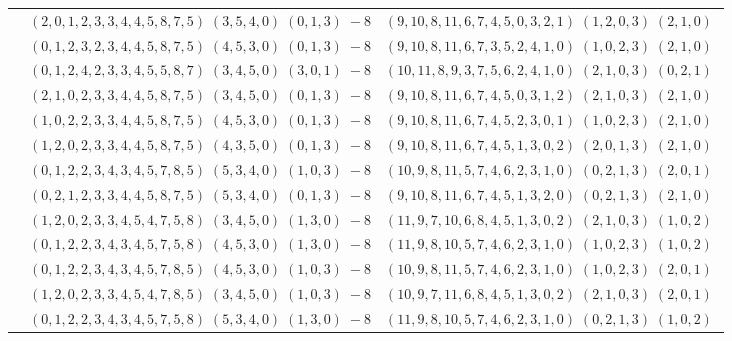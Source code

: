 \documentclass[11pt]{article}
\begin{document}
\begin{longtable}[l]{|c|c|c|}
 \cline{2-3} 
 & $(2 ,0 ,1 ,2 ,3 ,3 ,4 ,4 ,5 ,8 ,7 ,5) \;(3 ,5 ,4 ,0) \;(0 ,1 ,3) \;-8$ & $(9 ,10 ,8 ,11 ,6 ,7 ,4 ,5 ,0 ,3 ,2 ,1) \;(1 ,2 ,0 ,3) \;(2 ,1 ,0) \;$\\ 
 \cline{2-3} 
 & $(0 ,1 ,2 ,3 ,2 ,3 ,4 ,4 ,5 ,8 ,7 ,5) \;(4 ,5 ,3 ,0) \;(0 ,1 ,3) \;-8$ & $(9 ,10 ,8 ,11 ,6 ,7 ,3 ,5 ,2 ,4 ,1 ,0) \;(1 ,0 ,2 ,3) \;(2 ,1 ,0) \;$\\ 
 \cline{2-3} 
 & $(0 ,1 ,2 ,4 ,2 ,3 ,3 ,4 ,5 ,5 ,8 ,7) \;(3 ,4 ,5 ,0) \;(3 ,0 ,1) \;-8$ & $(10 ,11 ,8 ,9 ,3 ,7 ,5 ,6 ,2 ,4 ,1 ,0) \;(2 ,1 ,0 ,3) \;(0 ,2 ,1) \;$\\ 
 \cline{2-3} 
 & $(2 ,1 ,0 ,2 ,3 ,3 ,4 ,4 ,5 ,8 ,7 ,5) \;(3 ,4 ,5 ,0) \;(0 ,1 ,3) \;-8$ & $(9 ,10 ,8 ,11 ,6 ,7 ,4 ,5 ,0 ,3 ,1 ,2) \;(2 ,1 ,0 ,3) \;(2 ,1 ,0) \;$\\ 
 \cline{2-3} 
 & $(1 ,0 ,2 ,2 ,3 ,3 ,4 ,4 ,5 ,8 ,7 ,5) \;(4 ,5 ,3 ,0) \;(0 ,1 ,3) \;-8$ & $(9 ,10 ,8 ,11 ,6 ,7 ,4 ,5 ,2 ,3 ,0 ,1) \;(1 ,0 ,2 ,3) \;(2 ,1 ,0) \;$\\ 
 \cline{2-3} 
 & $(1 ,2 ,0 ,2 ,3 ,3 ,4 ,4 ,5 ,8 ,7 ,5) \;(4 ,3 ,5 ,0) \;(0 ,1 ,3) \;-8$ & $(9 ,10 ,8 ,11 ,6 ,7 ,4 ,5 ,1 ,3 ,0 ,2) \;(2 ,0 ,1 ,3) \;(2 ,1 ,0) \;$\\ 
 \cline{2-3} 
 & $(0 ,1 ,2 ,2 ,3 ,4 ,3 ,4 ,5 ,7 ,8 ,5) \;(5 ,3 ,4 ,0) \;(1 ,0 ,3) \;-8$ & $(10 ,9 ,8 ,11 ,5 ,7 ,4 ,6 ,2 ,3 ,1 ,0) \;(0 ,2 ,1 ,3) \;(2 ,0 ,1) \;$\\ 
 \cline{2-3} 
 & $(0 ,2 ,1 ,2 ,3 ,3 ,4 ,4 ,5 ,8 ,7 ,5) \;(5 ,3 ,4 ,0) \;(0 ,1 ,3) \;-8$ & $(9 ,10 ,8 ,11 ,6 ,7 ,4 ,5 ,1 ,3 ,2 ,0) \;(0 ,2 ,1 ,3) \;(2 ,1 ,0) \;$\\ 
 \cline{2-3} 
 & $(1 ,2 ,0 ,2 ,3 ,3 ,4 ,5 ,4 ,7 ,5 ,8) \;(3 ,4 ,5 ,0) \;(1 ,3 ,0) \;-8$ & $(11 ,9 ,7 ,10 ,6 ,8 ,4 ,5 ,1 ,3 ,0 ,2) \;(2 ,1 ,0 ,3) \;(1 ,0 ,2) \;$\\ 
 \cline{2-3} 
 & $(0 ,1 ,2 ,2 ,3 ,4 ,3 ,4 ,5 ,7 ,5 ,8) \;(4 ,5 ,3 ,0) \;(1 ,3 ,0) \;-8$ & $(11 ,9 ,8 ,10 ,5 ,7 ,4 ,6 ,2 ,3 ,1 ,0) \;(1 ,0 ,2 ,3) \;(1 ,0 ,2) \;$\\ 
 \cline{2-3} 
 & $(0 ,1 ,2 ,2 ,3 ,4 ,3 ,4 ,5 ,7 ,8 ,5) \;(4 ,5 ,3 ,0) \;(1 ,0 ,3) \;-8$ & $(10 ,9 ,8 ,11 ,5 ,7 ,4 ,6 ,2 ,3 ,1 ,0) \;(1 ,0 ,2 ,3) \;(2 ,0 ,1) \;$\\ 
 \cline{2-3} 
 & $(1 ,2 ,0 ,2 ,3 ,3 ,4 ,5 ,4 ,7 ,8 ,5) \;(3 ,4 ,5 ,0) \;(1 ,0 ,3) \;-8$ & $(10 ,9 ,7 ,11 ,6 ,8 ,4 ,5 ,1 ,3 ,0 ,2) \;(2 ,1 ,0 ,3) \;(2 ,0 ,1) \;$\\ 
 \cline{2-3} 
 & $(0 ,1 ,2 ,2 ,3 ,4 ,3 ,4 ,5 ,7 ,5 ,8) \;(5 ,3 ,4 ,0) \;(1 ,3 ,0) \;-8$ & $(11 ,9 ,8 ,10 ,5 ,7 ,4 ,6 ,2 ,3 ,1 ,0) \;(0 ,2 ,1 ,3) \;(1 ,0 ,2) \;$\\ 

\end{longtable}
\end{document}
